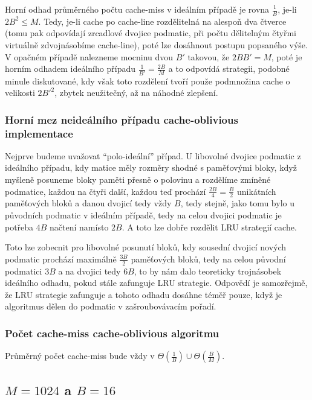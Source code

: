 \documentclass[a4paper,12pt]{article} %
\begin{document}
Horní odhad průměrného počtu cache-miss v ideálním případě je rovna $\frac{1}{B}$, je-li $2 B^2 \leq M$. Tedy, je-li cache po cache-line rozdělitelná na alespoň dva čtverce (tomu pak odpovídají zrcadlové dvojice podmatic, při počtu dělitelným čtyřmi virtuálně zdvojnásobíme cache-line), poté lze dosáhnout postupu popsaného výše. V opačném případě nalezneme mocninu dvou $B'$ takovou, že $2 B B' = M$, poté je horním odhadem ideálního případu $\frac{1}{B'} = \frac{2B}{M}$ a to odpovídá strategii, podobné minule diskutované, kdy však toto rozdělení tvoří použe podmnožina cache o velikosti $2 B'^2$, zbytek neužitečný, až na náhodné zlepšení.

\subsubsection*{Horní mez neideálního případu cache-oblivious implementace}

Nejprve budeme uvažovat ``polo-ideální'' případ. U libovolné dvojice podmatic z ideálního případu, kdy matice měly rozměry shodné s paměťovými bloky, když myšleně posuneme bloky paměti přesně o polovinu a rozdělíme zmíněné podmatice, každou na čtyři další, každou teď prochází $\frac{2B}{4} = \frac{B}{2}$ unikátních paměťových bloků a danou dvojicí tedy vždy $B$, tedy stejně, jako tomu bylo u původních podmatic v ideálním případě, tedy na celou dvojici podmatic je potřeba $4B$ načtení namísto $2B$. A toto lze dobře rozdělit LRU strategií cache.

Toto lze zobecnit pro libovolné posunutí bloků, kdy sousední dvojicí nových podmatic prochází maximálně $\frac{3B}{2}$ paměťových bloků, tedy na celou původní podmatici $3B$ a na dvojici tedy $6B$, to by nám dalo teoreticky trojnásobek ideálního odhadu, pokud stále zafunguje LRU strategie. Odpovědí je samozřejmě, že LRU strategie zafunguje a tohoto odhadu dosáhne téměř pouze, když je algoritmus dělen do podmatic v zašroubovávacím pořadí.

\subsubsection*{Počet cache-miss cache-oblivious algoritmu}

Průměrný počet cache-miss bude vždy v $\Theta\left(\frac{1}{B}\right) \cup \Theta\left(\frac{B}{M}\right)$.

\pagebreak

\subsection*{$M = 1024$ a $B = 16$}
\end{document}
